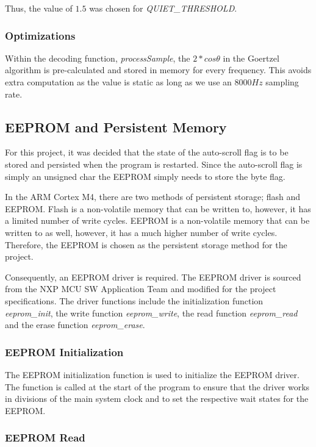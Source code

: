 \documentclass{cce2014-design}
\begin{document}
Thus, the value of $1.5$ was chosen for \textit{QUIET\_THRESHOLD}.

\subsubsection{Optimizations}

Within the decoding function, \textit{processSample}, the $2*cos\theta$ in the Goertzel algorithm is pre-calculated and stored in memory for every frequency.
This avoids extra computation as the value is static as long as we use an $8000Hz$ sampling rate.

\subsection{EEPROM and Persistent Memory}

For this project, it was decided that the state of the auto-scroll flag is to be stored and persisted when the program is restarted.
Since the auto-scroll flag is simply an unsigned char the EEPROM simply needs to store the byte flag.

In the ARM Cortex M4, there are two methods of persistent storage; flash and EEPROM.
Flash is a non-volatile memory that can be written to, however, it has a limited number of write cycles.
EEPROM is a non-volatile memory that can be written to as well, however, it has a much higher number of write cycles.
Therefore, the EEPROM is chosen as the persistent storage method for the project.

Consequently, an EEPROM driver is required.
The EEPROM driver is sourced from the NXP MCU SW Application Team and modified for the project specifications.
The driver functions include the initialization function \textit{eeprom\_init}, the write function \textit{eeprom\_write}, the read function \textit{eeprom\_read} and the erase function \textit{eeprom\_erase}.

\subsubsection{EEPROM Initialization}

The EEPROM initialization function is used to initialize the EEPROM driver.
The function is called at the start of the program to ensure that the driver works in divisions of the main system clock and to set the respective wait states for the EEPROM.

\subsubsection{EEPROM Read}
\end{document}
